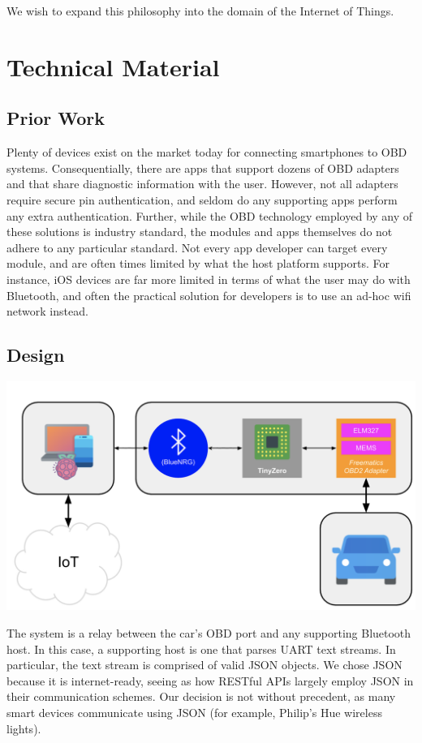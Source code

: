 \documentclass[10pt,letterpaper,unboxed,cm]{article}
\begin{document}
We wish to expand this philosophy into the domain of the Internet of Things.

\section{Technical Material}

\subsection{Prior Work}

Plenty of devices exist on the market today for connecting smartphones to OBD systems. Consequentially, there are apps that support dozens of OBD adapters and that share diagnostic information with the user. However, not all adapters require secure pin authentication, and seldom do any supporting apps perform any extra authentication. Further, while the OBD technology employed by any of these solutions is industry standard, the modules and apps themselves do not adhere to any particular standard. Not every app developer can target every module, and are often times limited by what the host platform supports. For instance, iOS devices are far more limited in terms of what the user may do with Bluetooth, and often the practical solution for developers is to use an ad-hoc wifi network instead. 

\subsection{Design}

\begin{center}
\includegraphics[width=0.7\linewidth]{pathway.png}
\end{center}

The system is a relay between the car's OBD port and any supporting Bluetooth host. In this case, a supporting host is one that parses UART text streams. In particular, the text stream is comprised of valid JSON objects. We chose JSON because it is internet-ready, seeing as how RESTful APIs largely employ JSON in their communication schemes. Our decision is not without precedent, as many smart devices communicate using JSON (for example, Philip's Hue wireless lights).
\end{document}
